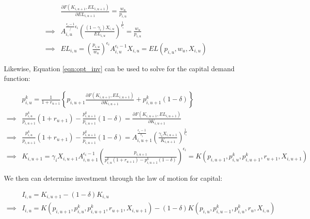 \documentclass[letterpaper,12pt]{article}
\theoremstyle{definition}
\begin{document}
\begin{spacing}{1.5}
\begin{equation}
\label{eqn:solve_dyn_l}
\begin{split}
 &\frac{\partial F(K_{i,u+1},EL_{i,u+1})}{\partial EL_{i,u+1}} =  \frac{w_{u}}{ p_{i,u}}  \\
 \implies & A_{i,u}^{\frac{\epsilon_{i}-1}/{\epsilon_{i}}}\left( \frac{(1-\gamma_{i})X_{i,u}}{EL_{i,u}}\right)^{\frac{1}{\epsilon_{i}}} =   \frac{w_{u}}{ p_{i,u}} \\
\implies & EL_{i,u} = \left( \frac{ p_{i,u}}{w_{u}}\right)^{\epsilon_{i}}A_{i,u}^{\epsilon_{i}-1}X_{i,u} = EL(p_{i,u},w_{u},X_{i,u})
\end{split}
\end{equation}

Likewise, Equation \ref{eqn:opt_inv} can be used to solve for the capital demand function:

\begin{equation}
\label{eqn:solve_dyn_k}
\begin{split}
 &p^{k}_{i,u} =  \frac{1}{1+r_{u+1}} \left\{p_{i,u+1}\frac{\partial F(K_{i,u+1},EL_{i,u+1})}{\partial K_{i,u+1}}+ p^{k}_{i,u+1}(1-\delta)  \right\}  \\
 \implies & \frac{p^{k}_{i,u}}{p_{i,u+1}}(1+r_{u+1}) - \frac{p^{k}_{i,u+1}}{p_{i,u+1}}(1-\delta) =\frac{\partial F(K_{i,u+1},EL_{i,u+1})}{\partial K_{i,u+1}} \\
\implies & \frac{p^{k}_{i,u}}{p_{i,u+1}}(1+r_{u+1}) - \frac{p^{k}_{i,u+1}}{p_{i,u+1}}(1-\delta) =A_{i,u+1}^{\frac{\epsilon_{i}-1}{\epsilon_{i}}} \left( \frac{\gamma_{i}X_{i,u+1}}{K_{i,u+1}}\right)^{\frac{1}{\epsilon_{i}}} \\
\implies & K_{i,u+1} = \gamma_{i}X_{i,u+1}A_{i,u+1}^{\epsilon_{i}-1} \left(\frac{p_{i,u+1}}{p^{k}_{i,u}(1+r_{u+1}) - p^{k}_{i,u+1}(1-\delta)} \right)^{\epsilon_{i}} = K(p_{i,u+1},p^{k}_{i,u},p^{k}_{i,u+1},r_{u+1},X_{i,u+1})
\end{split}
\end{equation}

We then can determine investment through the law of motion for capital:

\begin{equation}
\label{eqn:solve_dyn_i}
\begin{split}
 &I_{i,u} = K_{i,u+1} - (1-\delta)K_{i,u} \\
\implies & I_{i,u} = K(p_{i,u+1},p^{k}_{i,u},p^{k}_{i,u+1},r_{u+1},X_{i,u+1}) - (1-\delta)K(p_{i,u},p^{k}_{i,u-1},p^{k}_{i,u},r_{u},X_{i,u}) 
\end{split}
\end{equation}


\end{spacing}
\end{document}
